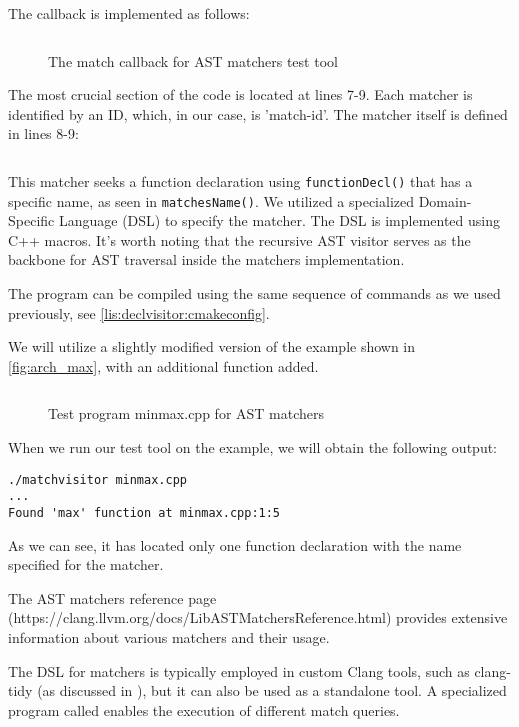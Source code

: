 The callback is implemented as follows:
\begin{figure}[H]
\inputminted[highlightlines={7-9}]{c++}{src/part1/ch3_ast/matchvisitor/MatchCallback.hpp}
  \caption{The match callback for AST matchers test tool}
  \label{lis:ch3:matchervisitor:callback}
\end{figure}
The most crucial section of the code is located at lines 7-9. Each matcher is
identified by an ID, which, in our case, is 'match-id'. The matcher itself is
defined in lines 8-9: 
\inputminted[firstline=8,lastline=9]{c++}{src/part1/ch3_ast/matchvisitor/MatchCallback.hpp}
This matcher seeks a function declaration using \texttt{functionDecl()} that has a specific name, as seen in \texttt{matchesName()}.
We utilized a specialized Domain-Specific Language (DSL) to specify the
matcher. The DSL is implemented using C++ macros. It's worth noting that the
recursive AST visitor serves as the backbone for AST traversal inside the
matchers implementation.

The program can be compiled using the same sequence of commands as we used
previously, see \cref{lis:declvisitor:cmakeconfig}.

We will utilize a slightly modified version of the example shown in
\cref{fig:arch_max}, with an additional function added.
\begin{figure}[H]
  \inputminted{c++}{src/part1/ch3_ast/minmax.cpp}
  \caption{Test program minmax.cpp for AST matchers}
  \label{lis:min:max}
\end{figure}

When we run our test tool on the example, we will obtain the following output:
\begin{adjustwidth}{0em}{0em}
\begin{verbatim}
./matchvisitor minmax.cpp
...
Found 'max' function at minmax.cpp:1:5
\end{verbatim}
\end{adjustwidth}
As we can see, it has located only one function declaration with the name
specified for the matcher. 

The AST matchers reference page
(https://clang.llvm.org/docs/LibASTMatchersReference.html) provides extensive
information about various matchers and their usage. 

The DSL for matchers is typically employed in custom Clang tools, such as
clang-tidy (as discussed in ), but it can also be used as
a standalone tool. A specialized program called  enables
the execution of different match queries. 

